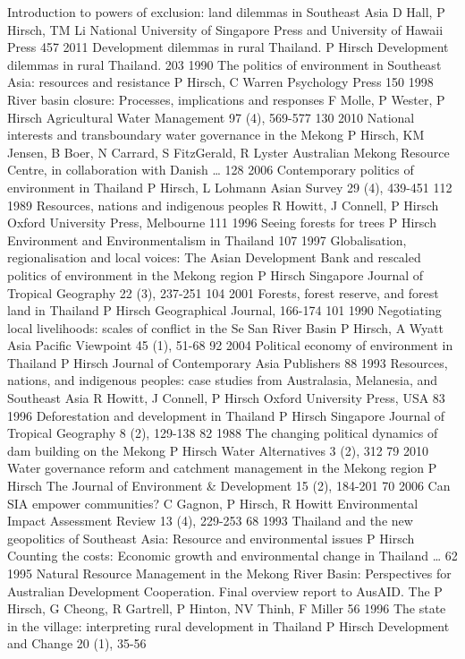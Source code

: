 Introduction to powers of exclusion: land dilemmas in Southeast Asia
D Hall, P Hirsch, TM Li
National University of Singapore Press and University of Hawaii Press	457	2011
Development dilemmas in rural Thailand.
P Hirsch
Development dilemmas in rural Thailand.	203	1990
The politics of environment in Southeast Asia: resources and resistance
P Hirsch, C Warren
Psychology Press	150	1998
River basin closure: Processes, implications and responses
F Molle, P Wester, P Hirsch
Agricultural Water Management 97 (4), 569-577	130	2010
National interests and transboundary water governance in the Mekong
P Hirsch, KM Jensen, B Boer, N Carrard, S FitzGerald, R Lyster
Australian Mekong Resource Centre, in collaboration with Danish …	128	2006
Contemporary politics of environment in Thailand
P Hirsch, L Lohmann
Asian Survey 29 (4), 439-451	112	1989
Resources, nations and indigenous peoples
R Howitt, J Connell, P Hirsch
Oxford University Press, Melbourne	111	1996
Seeing forests for trees
P Hirsch
Environment and Environmentalism in Thailand	107	1997
Globalisation, regionalisation and local voices: The Asian Development Bank and rescaled politics of environment in the Mekong region
P Hirsch
Singapore Journal of Tropical Geography 22 (3), 237-251	104	2001
Forests, forest reserve, and forest land in Thailand
P Hirsch
Geographical Journal, 166-174	101	1990
Negotiating local livelihoods: scales of conflict in the Se San River Basin
P Hirsch, A Wyatt
Asia Pacific Viewpoint 45 (1), 51-68	92	2004
Political economy of environment in Thailand
P Hirsch
Journal of Contemporary Asia Publishers	88	1993
Resources, nations, and indigenous peoples: case studies from Australasia, Melanesia, and Southeast Asia
R Howitt, J Connell, P Hirsch
Oxford University Press, USA	83	1996
Deforestation and development in Thailand
P Hirsch
Singapore Journal of Tropical Geography 8 (2), 129-138	82	1988
The changing political dynamics of dam building on the Mekong
P Hirsch
Water Alternatives 3 (2), 312	79	2010
Water governance reform and catchment management in the Mekong region
P Hirsch
The Journal of Environment \& Development 15 (2), 184-201	70	2006
Can SIA empower communities?
C Gagnon, P Hirsch, R Howitt
Environmental Impact Assessment Review 13 (4), 229-253	68	1993
Thailand and the new geopolitics of Southeast Asia: Resource and environmental issues
P Hirsch
Counting the costs: Economic growth and environmental change in Thailand …	62	1995
Natural Resource Management in the Mekong River Basin: Perspectives for Australian Development Cooperation. Final overview report to AusAID. The
P Hirsch, G Cheong, R Gartrell, P Hinton, NV Thinh, F Miller
56	1996
The state in the village: interpreting rural development in Thailand
P Hirsch
Development and Change 20 (1), 35-56
